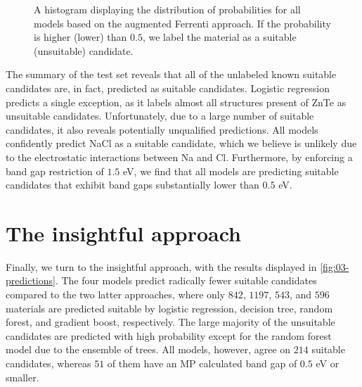 \begin{figure}[ht!]
    \centering
    
    \vspace*{-130mm}
    \caption{A histogram displaying the distribution of probabilities for all models based on the augmented Ferrenti approach. If the probability is higher (lower) than $0.5$, we label the material as a suitable (unsuitable) candidate.}
    \label{fig:histogram-augmented-ferrenti}
\end{figure}

The summary of the test set reveals that all of the unlabeled known suitable candidates are, in fact, predicted as suitable candidates. Logistic regression predicts a single exception, as it labels almost all structures present of ZnTe as unsuitable candidates. Unfortunately, due to a large number of suitable candidates, it also reveals potentially unqualified predictions. All models confidently predict NaCl as a suitable candidate, which we believe is unlikely due to the electrostatic interactions between Na and Cl. Furthermore, by enforcing a band gap restriction of $1.5$ eV, we find that all models are predicting suitable candidates that exhibit band gaps substantially lower than $0.5$ eV.



\section{The insightful approach}

Finally, we turn to the insightful approach, with the results displayed in \autoref{fig:03-predictions}. The four models predict radically fewer suitable candidates compared to the two latter approaches, where only $842$, $1197$, $543$, and $596$ materials are predicted suitable by logistic regression, decision tree, random forest, and gradient boost, respectively. The large majority of the unsuitable candidates are predicted with high probability except for the random forest model due to the ensemble of trees. All models, however, agree on $214$ suitable candidates, whereas $51$ of them have an MP calculated band gap of $0.5$ eV or smaller.



